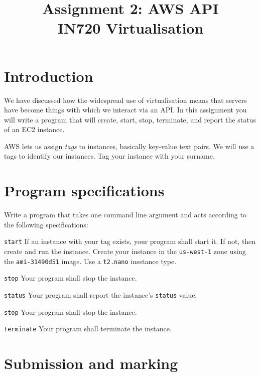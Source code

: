 \documentclass{article}
\begin{document}
\title{Assignment 2: AWS API\\ IN720 Virtualisation}
\date{}
\maketitle

\section*{Introduction}
We have discussed how the widespread use of virtualisation means that servers have become things with which we interact via an API. In this assignment you will write a program that will create, start, stop, terminate, and report the status of an EC2 instance.

AWS lets us assign \emph{tags} to instances, basically key-value text pairs. We will use a tags to identify our instances. Tag your instance with your surname.

\section{Program specifications}
Write a program that takes one command line argument and acts according to the following specifications:

\begin{description}
  \item{\texttt{start}} If an instance with your tag exists, your program shall start it.  If not, then create and run the instance. Create your instance in the \texttt{us-west-1} zone using the \texttt{ami-31490d51} image. Use a \texttt{t2.nano} insstance type.
  
  \item{\texttt{stop}} Your program shall stop the instance.
  
  \item{\texttt{status}} Your program shall report the instance's  \texttt{status} value.
  
  \item{\texttt{stop}} Your program shall stop the instance.
  
  \item{\texttt{terminate}} Your program shall terminate the instance.

\end{description}

\section{Submission and marking} 
\end{document}
